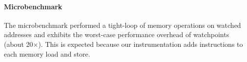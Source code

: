 \paragraph{Microbenchmark} The microbenchmark performed a tight-loop of memory operations on watched addresses and exhibits the worst-case performance overhead of watchpoints (about 20{\footnotesize$\times$}). This is expected because our instrumentation adds instructions to each memory load and store.

